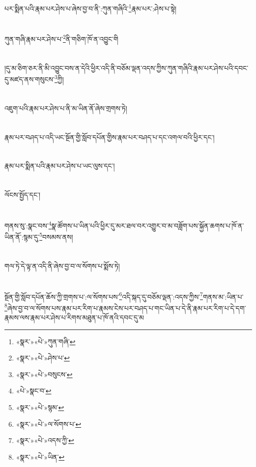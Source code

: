 པར་སྨིན་པའི་རྣམ་པར་ཤེས་པ་ཞེས་བྱ་བ་ནི་:ཀུན་གཞིའི་\footnote{«སྣར་»«པེ་»ཀུན་གཞི་}རྣམ་པར་:ཤེས་པ་སྟེ།\chapter{ }ཀུན་གཞི་རྣམ་པར་ཤེས་པ་\footnote{«སྣར་»«པེ་»ཤེས་པ་}ནི་གཅིག་ཁོ་ན་འབྱུང་གི\chapter{ }།དུ་མ་ཅིག་ཅར་ནི་མི་འབྱུང་བས་ན་དེའི་ཕྱིར་འདི་ནི་བཅོམ་ལྡན་འདས་ཀྱིས་ཀུན་གཞིའི་རྣམ་པར་ཤེས་པའི་དབང་དུ་མཛད་ནས་གསུངས་\footnote{«སྣར་»«པེ་»བསུངས་}ཀྱི།\chapter{ }འཇུག་པའི་རྣམ་པར་ཤེས་པ་ནི་མ་ཡིན་ནོ་ཞེས་གྲགས་ཏེ།\chapter{ }རྣམ་པར་བཤད་པ་འདི་ཡང་སྔོན་གྱི་སློབ་དཔོན་གྱིས་རྣམ་པར་བཤད་པ་དང་འགལ་བའི་ཕྱིར་དང་།\chapter{ }རྣམ་པར་སྨིན་པའི་རྣམ་པར་ཤེས་པ་ཡང་ལུས་དང་།\chapter{ }ལོངས་སྤྱོད་དང་།\chapter{ }གནས་སུ་:སྣང་བས་\footnote{«པེ་»སྣང་བ་}སྣ་ཚོགས་པ་ཡིན་པའི་ཕྱིར་དུ་མར་ཐལ་བར་འགྱུར་བ་མ་བཟློག་པས་སྐྱོན་ཆགས་པ་ཁོ་ན་ཡིན་ནོ་:སྙམ་དུ་\footnote{«སྣར་»«པེ་»སྙམ་}བསམས་ནས།\chapter{ }གལ་ཏེ་དེ་ལྟ་ན་འདི་ནི་ཞེས་བྱ་བ་ལ་སོགས་པ་སྨོས་ཏེ།\chapter{ }སྔོན་གྱི་སློབ་དཔོན་ཆོས་ཀྱི་གྲགས་པ་:ལ་སོགས་པས་\footnote{«སྣར་»«པེ་»ལ་སོགས་པ་}འདི་སྐད་དུ་བཅོམ་ལྡན་:འདས་ཀྱིས་\footnote{«སྣར་»«པེ་»འདས་ཀྱི་}གནས་མ་:ཡིན་པ་\footnote{«སྣར་»«པེ་»ཡིན་}ཞེས་བྱ་བ་ལ་སོགས་པས་རྣམ་པར་རིག་པ་རྣམས་ངེས་པར་བཤད་པ་གང་ཡིན་པ་དེ་ནི་རྣམ་པར་རིག་པ་དེ་དག་རྣམས་ལས་རྣམ་པར་ཤེས་པ་རིགས་མཐུན་པ་ཁོ་ནའི་དབང་དུ་མ